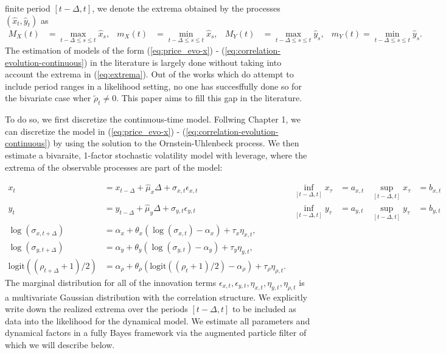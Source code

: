 \documentclass[10pt]{article}
\begin{document}
finite period $[t-\Delta, t]$, we denote the extrema obtained by the
processes $(\hat{x}_t, \hat{y}_t)$ as
\begin{align}
M_X(t) &=\max_{t-\Delta\leq s\leq t}\hat{x}_s, & m_X(t) &=\min_{t-\Delta\leq s\leq t}\hat{x}_s, &
M_Y(t) &=\max_{t-\Delta\leq s\leq t}\hat{y}_s, & m_Y(t)=\min_{t-\Delta \leq s\leq t}\hat{y}_s. \label{eq:extrema}
\end{align}
The estimation of models of the form (\ref{eq:price_evo-x}) -
(\ref{eq:correlation-evolution-continuous}) in the literature is
largely done without taking into account the extrema in
(\ref{eq:extrema}). Out of the works which do attempt to include
period ranges in a likelihood setting, no one has succesffully done so
for the bivariate case wher $\tilde{\rho}_t \neq 0$. This paper aims to fill
this gap in the literature. 

To do so, we first discretize the continuous-time model. Follwing
Chapter 1, we can discretize the model in (\ref{eq:price_evo-x}) -
(\ref{eq:correlation-evolution-continuous}) by using the solution to
the Ornstein-Uhlenbeck process.  We then estimate a
bivaraite, 1-factor stochastic volatility model with leverage, where
the extrema of the observable processes are part of the model:

\begin{align}
  x_t &= x_{t-\Delta} + \hat{\mu}_x\Delta + \sigma_{x,t} \epsilon_{x,t} & \inf_{[t-\Delta,t]} x_\tau &= a_{x,t}&  \sup_{[t-\Delta,t]} x_\tau &= b_{x,t} \label{eq:evolution-process} \\
  y_t &= y_{t-\Delta} + \hat{\mu}_y\Delta + \sigma_{y,t} \epsilon_{y,t} & \inf_{[t-\Delta,t]} y_\tau &= a_{y,t}&  \sup_{[t-\Delta,t]} y_\tau &= b_{y,t}\\
   \log(\sigma_{x,t+\Delta}) &= \alpha_x + \theta_x(\log(\sigma_{x,t}) - \alpha_x) + \tau_x \eta_{x,t}, \\
  \log(\sigma_{y,t+\Delta}) &= \alpha_y + \theta_y(\log(\sigma_{y,t}) - \alpha_y) + \tau_y \eta_{y,t}, \\
  \mbox{logit}((\rho_{t+\Delta} + 1)/2) &= \alpha_\rho + \theta_\rho\left(\mbox{logit}((\rho_{t}+1)/2) - \alpha_\rho\right) + \tau_{\rho} \eta_{\rho,t}. \label{eq:correlation-evolution}
\end{align}
The marginal distribution for all of the innovation terms
$\epsilon_{x,t}, \epsilon_{y,t}, \eta_{x,t}, \eta_{y,t},
\eta_{\rho,t}$ is a multivariate Gaussian distribution with the
correlation structure. We explicitly write down the realized extrema
over the periods $[t-\Delta,t]$ to be included as data into the
likelihood for the dynamical model. We estimate all parameters and
dynamical factors in a fully Bayes framework via the augmented
particle filter of \cite{liu2001combined} which we will describe
below.
\end{document}
